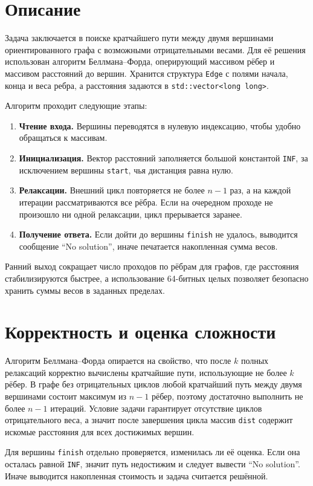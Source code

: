 \section{Описание}
Задача заключается в поиске кратчайшего пути между двумя вершинами ориентированного графа с возможными отрицательными весами. Для её решения использован алгоритм Беллмана--Форда, оперирующий массивом рёбер и массивом расстояний до вершин. Хранится структура \texttt{Edge} с полями начала, конца и веса ребра, а расстояния задаются в \texttt{std::vector<long long>}.

Алгоритм проходит следующие этапы:
\begin{enumerate}
\item \textbf{Чтение входа.} Вершины переводятся в нулевую индексацию, чтобы удобно обращаться к массивам.
\item \textbf{Инициализация.} Вектор расстояний заполняется большой константой \texttt{INF}, за исключением вершины \texttt{start}, чья дистанция равна нулю.
\item \textbf{Релаксации.} Внешний цикл повторяется не более $n-1$ раз, а на каждой итерации рассматриваются все рёбра. Если на очередном проходе не произошло ни одной релаксации, цикл прерывается заранее.
\item \textbf{Получение ответа.} Если дойти до вершины \texttt{finish} не удалось, выводится сообщение \enquote{No solution}, иначе печатается накопленная сумма весов.
\end{enumerate}

Ранний выход сокращает число проходов по рёбрам для графов, где расстояния стабилизируются быстрее, а использование 64-битных целых позволяет безопасно хранить суммы весов в заданных пределах.

\pagebreak

\section{Корректность и оценка сложности}
Алгоритм Беллмана--Форда опирается на свойство, что после $k$ полных релаксаций корректно вычислены кратчайшие пути, использующие не более $k$ рёбер. В графе без отрицательных циклов любой кратчайший путь между двумя вершинами состоит максимум из $n-1$ рёбер, поэтому достаточно выполнить не более $n-1$ итераций. Условие задачи гарантирует отсутствие циклов отрицательного веса, а значит после завершения цикла массив \texttt{dist} содержит искомые расстояния для всех достижимых вершин.

Для вершины \texttt{finish} отдельно проверяется, изменилась ли её оценка. Если она осталась равной \texttt{INF}, значит путь недостижим и следует вывести \enquote{No solution}. Иначе выводится накопленная стоимость и задача считается решённой.

